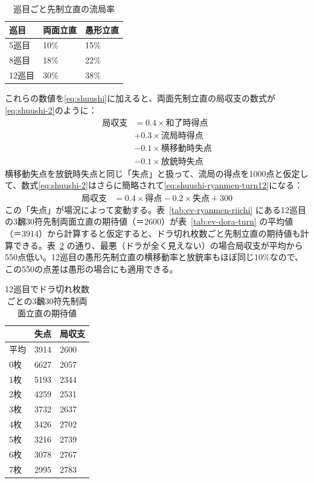\documentclass[10pt, twocolumn, notitlepage]{report}
\begin{document}
\begin{table}
  \centering
  \begin{tabular}{lll}
    巡目 & 両面立直 & 愚形立直 \\
    \hline
    5巡目 & 10\% & 15\% \\
    8巡目 & 18\% & 22\% \\
    12巡目 & 30\% & 38\% \\
  \end{tabular}
  \caption{巡目ごと先制立直の流局率}
  \label{tab:exhaust-prob}
\end{table}

これらの数値を\eqref{eq:shuushi}に加えると、両面先制立直の局収支の数式が\eqref{eq:shuushi-2}のように：
%
\begin{align}
  \text{局収支} &= 0.4 \times \text{和了時得点} \nonumber \\
  &+ 0.3 \times \text{流局時得点} \nonumber \\
  &- 0.1 \times \text{横移動時失点} \nonumber \\
  &- 0.1 \times \text{放銃時失点} \label{eq:shuushi-2}
\end{align}
%
横移動失点を放銃時失点と同じ「失点」と扱って、流局の得点を1000点と仮定して、数式\eqref{eq:shuushi-2}はさらに簡略されて\eqref{eq:shuushi-ryanmen-turn12}になる：
%
\begin{align}
  \text{局収支} &= 0.4 \times \text{得点} - 0.2 \times \text{失点} + 300 \label{eq:shuushi-ryanmen-turn12}
\end{align}
%
この「失点」が場況によって変動する。表~\ref{tab:ev-ryanmen-riichi} にある12巡目の3飜30符先制両面立直の期待値（＝2600）が表~\ref{tab:ev-dora-turn} の平均値（＝3914）から計算すると仮定すると、ドラ切れ枚数ごと先制立直の期待値も計算できる。表~\ref{tab:kss-00} の通り、最悪（ドラが全く見えない）の場合局収支が平均から550点低い。12巡目の愚形先制立直の横移動率と放銃率もほぼ同じ10\%なので、この550の点差は愚形の場合にも適用できる。

\begin{table}
  \centering
  \begin{tabular}{lll}
        & 失点 & 局収支 \\
    \hline
    平均 & 3914 & 2600 \\
    0枚 & 6627 & 2057 \\
    1枚 & 5193 & 2344 \\
    2枚 & 4259 & 2531 \\
    3枚 & 3732 & 2637 \\
    4枚 & 3426 & 2702 \\
    5枚 & 3216 & 2739 \\
    6枚 & 3078 & 2767 \\
    7枚 & 2995 & 2783
  \end{tabular}
  \caption{12巡目でドラ切れ枚数ごとの3飜30符先制両面立直の期待値}
  \label{tab:kss-00}
\end{table}
\end{document}
